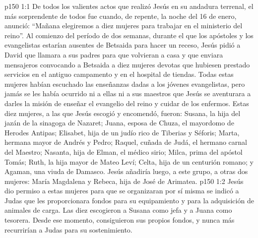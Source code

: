 \vs p150 1:1 De todos los valientes actos que realizó Jesús en su andadura terrenal, el más sorprendente de todos fue cuando, de repente, la noche del 16 de enero, anunció: “Mañana elegiremos a diez mujeres para trabajar en el ministerio del reino”. Al comienzo del período de dos semanas, durante el que los apóstoles y los evangelistas estarían ausentes de Betsaida para hacer un receso, Jesús pidió a David que llamara a sus padres para que volvieran a casa y que enviara mensajeros convocando a Betsaida a diez mujeres devotas que hubiesen prestado servicios en el antiguo campamento y en el hospital de tiendas. Todas estas mujeres habían escuchado las enseñanzas dadas a los jóvenes evangelistas, pero jamás se les había ocurrido ni a ellas ni a sus maestros que Jesús se aventurara a darles la misión de enseñar el evangelio del reino y cuidar de los enfermos. Estas diez mujeres, a las que Jesús escogió y encomendó, fueron: Susana, la hija del jazán de la sinagoga de Nazaret; Juana, esposa de Chuza, el mayordomo de Herodes Antipas; Elisabet, hija de un judío rico de Tiberias y Séforis; Marta, hermana mayor de Andrés y Pedro; Raquel, cuñada de Judá, el hermano carnal del Maestro; Nasanta, hija de Elman, el médico sirio; Milca, prima del apóstol Tomás; Ruth, la hija mayor de Mateo Leví; Celta, hija de un centurión romano; y Agaman, una viuda de Damasco. Jesús añadiría luego, a este grupo, a otras dos mujeres: María Magdalena y Rebeca, hija de José de Arimatea.
\vs p150 1:2 Jesús dio permiso a estas mujeres para que se organizaran por sí misma se indicó a Judas que les proporcionara fondos para su equipamiento y para la adquisición de animales de carga. Las diez escogieron a Susana como jefa y a Juana como tesorera. Desde ese momento, consiguieron sus propios fondos, y nunca más recurrirían a Judas para su sostenimiento.
